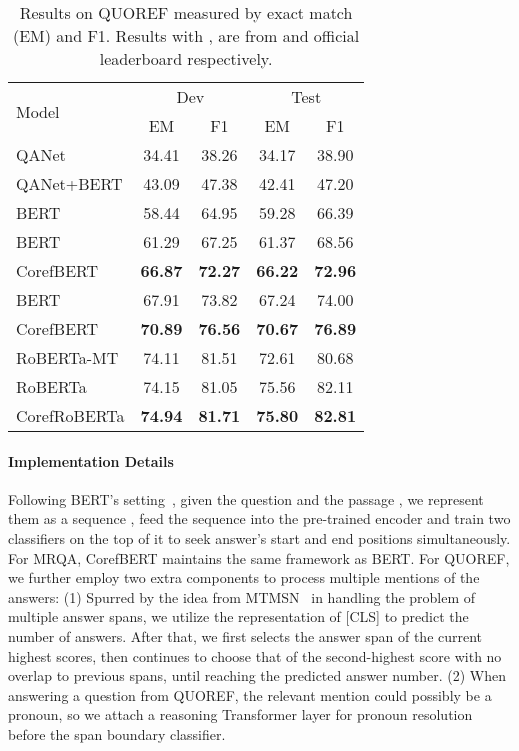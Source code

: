 \documentclass[11pt,a4paper]{article}
\newcommand\BASESIZE{\xspace}
\newcommand\LARGESIZE{\xspace}
\begin{document}
\begin{table}[!t]
\small
\centering
\begin{tabular}{l c c c c}
\toprule

\multirow{2}{*}{Model}   &\multicolumn{2}{c}{Dev}   &  \multicolumn{2}{c}{Test}  \\
                        &  EM        & F1            & EM        & F1 \\
\midrule
QANet & 34.41& 38.26& 34.17& 38.90 \\
QANet+BERT\BASESIZE  & 43.09 & 47.38& 42.41& 47.20 \\
BERT\BASESIZE  & 58.44 & 64.95& 59.28& 66.39 \\
BERT\BASESIZE  & 61.29 &  67.25   & 61.37  & 68.56  \\
CorefBERT  & \bf{66.87} & \bf{72.27} & \bf{66.22}& \bf{72.96} \\
\midrule
BERT\LARGESIZE  & 67.91 & 73.82 & 67.24  & 74.00  \\
CorefBERT\LARGESIZE  & \bf{70.89} & \bf{76.56} & \bf{70.67} & \bf{76.89}  \\
\midrule
RoBERTa-MT  & 74.11 & 81.51 & 72.61 & 80.68 \\
RoBERTa\LARGESIZE &  74.15 & 81.05 &  75.56 & 82.11 \\
CorefRoBERTa\LARGESIZE  & \bf{74.94} & \bf{81.71} & \bf{75.80} & \bf{82.81} \\
\bottomrule
\end{tabular}
\caption{Results on QUOREF measured by exact match (EM) and F1. Results with ,  are from \citet{QUOREF} and official leaderboard respectively. }
\label{tab:QUOREF_results}
\end{table}

\vspace{-0.1em}
\paragraph{Implementation Details} Following BERT's setting~\citep{BERT}, given the question  and the passage , we represent them as a sequence  , feed the sequence  into the pre-trained encoder and train two classifiers on the top of it to seek answer's start and end positions simultaneously. For MRQA, CorefBERT maintains the same framework as BERT. For QUOREF, we further employ two extra components to process multiple mentions of the answers: (1) Spurred by the idea from MTMSN~\citep{MTMSN} in handling the problem of multiple answer spans, we utilize the representation of \textup{[CLS]} to predict the number of answers. After that, we first selects the answer span of the current highest scores, then continues to choose that of the second-highest score with no overlap to previous spans, until reaching the predicted answer number. 
(2) When answering a question from QUOREF, the relevant mention could possibly be a pronoun, so we attach a reasoning Transformer layer for pronoun resolution before the span boundary classifier.
\end{document}
